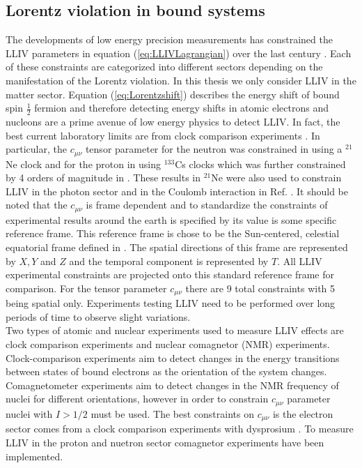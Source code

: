 \documentclass[10pt,a4paper, twoside, openright]{report}
\begin{document}
\subsection{Lorentz violation in bound systems} \label{sec:LorentzBound}
The developments of low energy precision measurements has constrained the LLIV parameters in equation (\ref{eq:LLIVLagrangian}) over the last  century \cite{LorentzDataTables2019}. Each of these constraints are categorized into different sectors depending on the manifestation of the Lorentz violation.  In this thesis we only consider LLIV in the matter sector. Equation (\ref{eq:Lorentzshift}) describes the energy shift of bound spin $\tfrac{1}{2}$ fermion and therefore detecting energy shifts in atomic electrons and nucleons are a prime avenue of low energy physics to detect LLIV. In fact, the best current laboratory limits are from clock comparison experiments \cite{Prestage1985, Chupp1989, Hohensee2013, Dzuba2016}. In particular, the $c_{\mu\nu}$ tensor parameter for the neutron was constrained in \cite{Smiciklas2011} using a $^{21}$Ne clock and for the proton in \cite{Wolf2006} using $^{133}$Cs clocks which was further constrained by 4 orders of magnitude in \cite{Flambaum2016}. These results in $^{21}$Ne were also used to constrain LLIV in the photon sector and in the Coulomb interaction in  Ref.\cite{FlambaumRomalis2017} . It should be noted that the $c_{\mu\nu}$ is frame dependent and to standardize the constraints of experimental results around the earth is specified by its value is some specific reference frame. This reference frame is chose to be the Sun-centered, celestial equatorial frame defined in \cite{LorentzDataTables2019, Bluhm2002}. The spatial directions of this frame are represented by $X,Y$ and $Z$ and the temporal component is represented by $T$. All LLIV experimental constraints are projected onto this standard reference frame for comparison. For the tensor parameter $c_{\mu\nu}$ there are 9 total constraints with 5 being spatial only. Experiments testing LLIV need to be performed over long periods of time to observe slight variations.\\
\linebreak
Two types of atomic and nuclear experiments used to measure LLIV effects are clock comparison experiments and nuclear comagnetor (NMR) experiments. Clock-comparison experiments aim to detect changes in the energy transitions between states of bound electrons as the orientation of the system changes. Comagnetometer experiments aim to detect changes in the NMR frequency of nuclei for different orientations, however in order to constrain $c_{\mu\nu}$ parameter nuclei with $I>1/2$ must be used. The best constraints on $c_{\mu\nu}$ is the electron sector comes from a clock comparison experiments with dysprosium \cite{Hohensee2013}. To measure LLIV in the proton and nuetron sector comagnetor experiments have been implemented. \\
\end{document}
